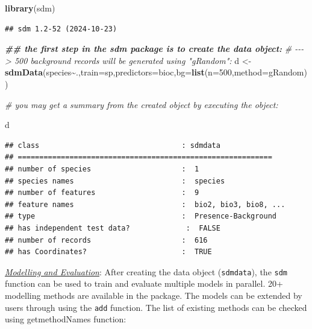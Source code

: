 \documentclass[
]{article}
\newenvironment{Shaded}{\begin{snugshade}}{\end{snugshade}}
\newcommand{\AttributeTok}[1]{\textcolor[rgb]{0.13,0.29,0.53}{#1}}
\newcommand{\CommentTok}[1]{\textcolor[rgb]{0.56,0.35,0.01}{\textit{#1}}}
\newcommand{\DecValTok}[1]{\textcolor[rgb]{0.00,0.00,0.81}{#1}}
\newcommand{\DocumentationTok}[1]{\textcolor[rgb]{0.56,0.35,0.01}{\textbf{\textit{#1}}}}
\newcommand{\FunctionTok}[1]{\textcolor[rgb]{0.13,0.29,0.53}{\textbf{#1}}}
\newcommand{\NormalTok}[1]{#1}
\newcommand{\OtherTok}[1]{\textcolor[rgb]{0.56,0.35,0.01}{#1}}
\newcommand{\SpecialCharTok}[1]{\textcolor[rgb]{0.81,0.36,0.00}{\textbf{#1}}}
\newcommand{\StringTok}[1]{\textcolor[rgb]{0.31,0.60,0.02}{#1}}
\begin{document}
\begin{Shaded}
\begin{Highlighting}[]
\FunctionTok{library}\NormalTok{(sdm)}
\end{Highlighting}
\end{Shaded}

\begin{verbatim}
## sdm 1.2-52 (2024-10-23)
\end{verbatim}

\begin{Shaded}
\begin{Highlighting}[]
\DocumentationTok{\#\# the first step in the sdm package is to create the data object:}
\CommentTok{\# {-}{-}{-}\textgreater{} 500 background records will be generated using "gRandom":}
\NormalTok{d }\OtherTok{\textless{}{-}} \FunctionTok{sdmData}\NormalTok{(species}\SpecialCharTok{\textasciitilde{}}\NormalTok{.,}\AttributeTok{train=}\NormalTok{sp,}\AttributeTok{predictors=}\NormalTok{bioc,}\AttributeTok{bg=}\FunctionTok{list}\NormalTok{(}\AttributeTok{n=}\DecValTok{500}\NormalTok{,}\AttributeTok{method=}\StringTok{\textquotesingle{}gRandom\textquotesingle{}}\NormalTok{))}

\CommentTok{\# you may get a summary from the created object by executing the object:}

\NormalTok{d}
\end{Highlighting}
\end{Shaded}

\begin{verbatim}
## class                                 : sdmdata 
## =========================================================== 
## number of species                     :  1 
## species names                         :  species 
## number of features                    :  9 
## feature names                         :  bio2, bio3, bio8, ... 
## type                                  :  Presence-Background 
## has independent test data?             :  FALSE 
## number of records                     :  616 
## has Coordinates?                      :  TRUE
\end{verbatim}

\uline{\textit{Modelling and Evaluation}}: After creating the data
object (\texttt{sdmdata}), the \texttt{sdm} function can be used to
train and evaluate multiple models in parallel. 20+ modelling methods
are available in the package. The models can be extended by users
through using the \texttt{add} function. The list of existing methods
can be checked using getmethodNames function:
\end{document}

